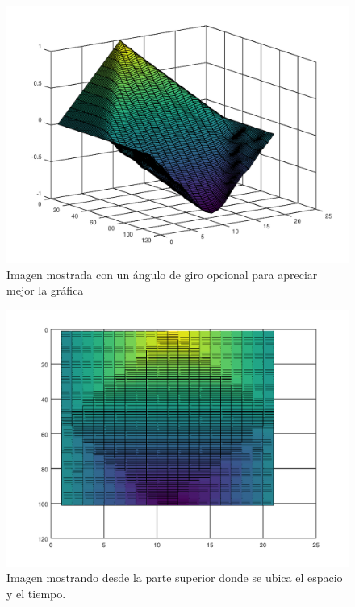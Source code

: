 \documentclass{article}
\begin{document}
\begin{figure}[H]
    \centering
    \includegraphics[scale=0.7]{3.2.png}
    \caption{Imagen mostrada con un ángulo de giro opcional para apreciar mejor la gráfica}
\end{figure}
\begin{figure}[H]
    \centering
    \includegraphics[scale=0.7]{3.3.png}
    \caption{Imagen mostrando desde la parte superior donde se ubica el espacio y el tiempo.}
\end{figure}
\end{document}
